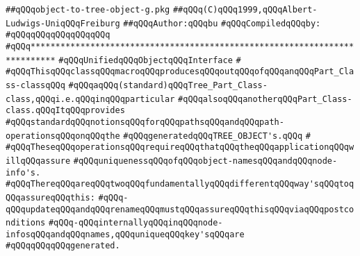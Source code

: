 \label{src/lib/tk/src/toolkit/object-to-tree-object-g.pkg}
\verb|##qQQqobject-to-tree-object-g.pkg|\newline
\verb|##qQQq(C)qQQq1999,qQQqAlbert-Ludwigs-UniqQQqFreiburg|\newline
\verb|##qQQqAuthor:qQQqbu|\newline
\newline
\verb|#qQQqCompiledqQQqby:|\newline
\verb|#qQQqqQQqqQQqqQQqqQQq|\newline
\newline
\newline
\newline
\verb|#qQQq***************************************************************************|\newline
\verb|#qQQqUnifiedqQQqObjectqQQqInterface|\newline
\verb|#|\newline
\verb|#qQQqThisqQQqclassqQQqmacroqQQqproducesqQQqoutqQQqofqQQqanqQQqPart_Class-classqQQq|\newline
\verb|#qQQqaqQQq(standard)qQQqTree_Part_Class-class,qQQqi.e.qQQqinqQQqparticular|\newline
\verb|#qQQqalsoqQQqanotherqQQqPart_Class-class.qQQqItqQQqprovides|\newline
\verb|#qQQqstandardqQQqnotionsqQQqforqQQqpathsqQQqandqQQqpath-operationsqQQqonqQQqthe|\newline
\verb|#qQQqgeneratedqQQqTREE_OBJECT's.qQQq|\newline
\verb|#|\newline
\verb|#qQQqTheseqQQqoperationsqQQqrequireqQQqthatqQQqtheqQQqapplicationqQQqwillqQQqassure|\newline
\verb|#qQQquniquenessqQQqofqQQqobject-namesqQQqandqQQqnode-info's.|\newline
\verb|#qQQqThereqQQqareqQQqtwoqQQqfundamentallyqQQqdifferentqQQqway'sqQQqtoqQQqassureqQQqthis:|\newline
\verb|#qQQq-qQQqupdateqQQqandqQQqrenameqQQqmustqQQqassureqQQqthisqQQqviaqQQqpostconditions|\newline
\verb|#qQQq-qQQqinternallyqQQqinqQQqnode-infosqQQqandqQQqnames,qQQquniqueqQQqkey'sqQQqare|\newline
\verb|#qQQqqQQqqQQqgenerated.|\newline
\newline
\newline
\newline
